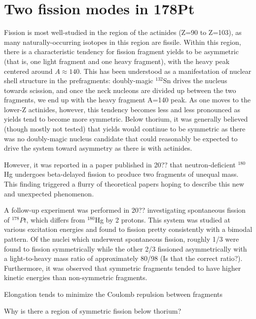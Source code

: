 \chapter{Two fission modes in 178Pt}\label{chap:178Pt}

\maketitle

Fission is most well-studied in the region of the actinides (Z=90 to Z=103), as many naturally-occurring isotopes in this region are fissile. Within this region, there is a characteristic tendency for fission fragment yields to be asymmetric (that is, one light fragment and one heavy fragment), with the heavy peak centered around $A\approx140$. This has been understood as a manifestation of nuclear shell structure in the prefragments: doubly-magic $^{132}$Sn drives the nucleus towards scission, and once the neck nucleons are divided up between the two fragments, we end up with the heavy fragment A=140 peak. As one moves to the lower-Z actinides, however, this tendency becomes less and less pronounced as yields tend to become more symmetric. Below thorium, it was generally believed (though mostly not tested) that yields would continue to be symmetric as there was no doubly-magic nucleus candidate that could reasonably be expected to drive the system toward asymmetry as there is with actinides.

However, it was reported in a paper published in 20?? \cite{Andreyev20??} that neutron-deficient $^{180}$Hg undergoes beta-delayed fission to produce two fragments of unequal mass. This finding triggered a flurry of theoretical papers hoping to describe this new and unexpected phenomenon.

A follow-up experiment was performed in 20?? \cite{our-Pt-paper} investigating spontaneous fission of $^{178}Pt$, which differs from $^{180}$Hg by 2 protons. This system was studied at various excitation energies and found to fission pretty consistently with a bimodal pattern. Of the nuclei which underwent spontaneous fission, roughly 1/3 were found to fission symmetrically while the other 2/3 fissioned asymmetrically with a light-to-heavy mass ratio of approximately 80/98 (Is that the correct ratio?). Furthermore, it was observed that symmetric fragments tended to have higher kinetic energies than non-symmetric fragments. 



Elongation tends to minimize the Coulomb repulsion between fragments

Why is there a region of symmetric fission below thorium?